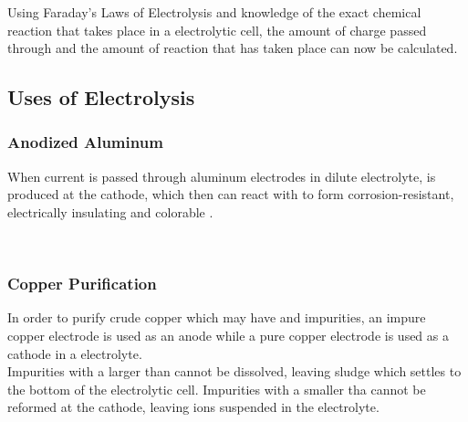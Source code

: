 \documentclass[../main]{subfiles}
\begin{document}




	Using Faraday's Laws of Electrolysis and knowledge of the exact chemical reaction that takes place in a electrolytic cell, the amount of charge passed through and the amount of reaction that has taken place can now be calculated.

	\subsection{Uses of Electrolysis}

	\subsubsection{Anodized Aluminum}

	When current is passed through aluminum electrodes in dilute  electrolyte,  is produced at the cathode, which then can react with  to form corrosion-resistant, electrically insulating and colorable . \\

	\begin{center}
		 \\
	\end{center}

	\subsubsection{Copper Purification}

	In order to purify crude copper which may have  and  impurities, an impure copper electrode is used as an anode while a pure copper electrode is used as a cathode in a  electrolyte. \\

	Impurities with a larger  than  cannot be dissolved, leaving  sludge which settles to the bottom of the electrolytic cell. Impurities with a smaller  tha  cannot be reformed at the cathode, leaving  ions suspended in the electrolyte.
\end{document}
